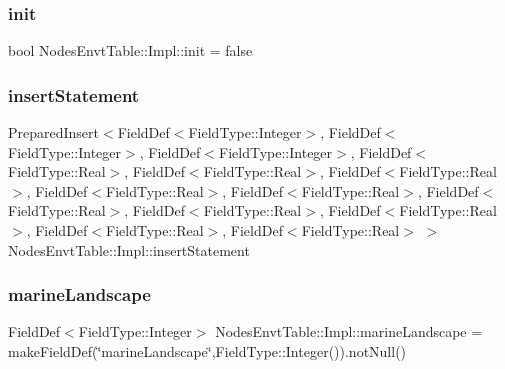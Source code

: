 \subsubsection{\texorpdfstring{init}{init}}
{\footnotesize\ttfamily bool Nodes\+Envt\+Table\+::\+Impl\+::init = false}

\mbox{\label{struct_nodes_envt_table_1_1_impl_a154d7b5b01542198708786d59c2102a4}} 
\subsubsection{\texorpdfstring{insertStatement}{insertStatement}}
{\footnotesize\ttfamily Prepared\+Insert$<$Field\+Def$<$Field\+Type\+::\+Integer$>$, Field\+Def$<$Field\+Type\+::\+Integer$>$, Field\+Def$<$Field\+Type\+::\+Integer$>$, Field\+Def$<$Field\+Type\+::\+Real$>$, Field\+Def$<$Field\+Type\+::\+Real$>$, Field\+Def$<$Field\+Type\+::\+Real$>$, Field\+Def$<$Field\+Type\+::\+Real$>$, Field\+Def$<$Field\+Type\+::\+Real$>$, Field\+Def$<$Field\+Type\+::\+Real$>$, Field\+Def$<$Field\+Type\+::\+Real$>$, Field\+Def$<$Field\+Type\+::\+Real$>$, Field\+Def$<$Field\+Type\+::\+Real$>$, Field\+Def$<$Field\+Type\+::\+Real$>$ $>$ Nodes\+Envt\+Table\+::\+Impl\+::insert\+Statement}

\mbox{\label{struct_nodes_envt_table_1_1_impl_a3e4eea99df8123d6debd99961b834a03}} 
\subsubsection{\texorpdfstring{marineLandscape}{marineLandscape}}
{\footnotesize\ttfamily Field\+Def$<$Field\+Type\+::\+Integer$>$ Nodes\+Envt\+Table\+::\+Impl\+::marine\+Landscape = make\+Field\+Def(\char`\"{}marine\+Landscape\char`\"{},Field\+Type\+::\+Integer()).not\+Null()}

\mbox{\label{struct_nodes_envt_table_1_1_impl_a0827a977002e6f8d7b3b0c316c5c973c}} 
